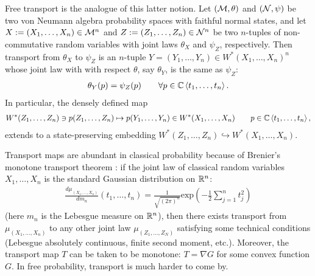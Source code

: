 Free transport is the analogue of this latter notion. Let $(\mathcal{M},\theta)$ and $(\mathcal{N},\psi)$ be two von Neumann algebra probability spaces with faithful normal states, and let $X:=(X_1,\ldots, X_n)\in \mathcal{M}^n$ and $Z:=(Z_1,\ldots, Z_n)\in \mathcal{N}^n$ be two $n$-tuples of non-commutative random variables with joint laws $\theta_X$ and $\psi_Z$, respectively. Then transport from $\theta_X$ to $\psi_Z$  is an $n$-tuple $Y=(Y_1,\ldots, Y_n) \in W^*(X_1,\ldots, X_n)^n$ whose joint law with with respect $\theta$, say $\theta_Y$, is the same as $\psi_Z$:
	\begin{align*}
		\theta_Y(p) = \psi_Z(p)\qquad \forall p\in \mathbb{C}\left\langle t_1,\ldots, t_n\right\rangle.
	\end{align*}
In particular, the densely defined map
	\begin{align*}
		W^*(Z_1,\ldots, Z_n)\ni p(Z_1,\ldots, Z_n) \mapsto p(Y_1,\ldots, Y_n)\in W^*(X_1,\ldots, X_n)\qquad p\in \mathbb{C}\left\langle t_1,\ldots, t_n\right\rangle,
	\end{align*}
extends to a state-preserving embedding $W^*(Z_1,\ldots, Z_n)\hookrightarrow W^*(X_1,\ldots, X_n)$.

Transport maps are abundant in classical probability because of Brenier's monotone transport theorem \cite{Bre91}: if the joint law of classical random variables $X_1,\ldots, X_n$ is the standard Gaussian distribution on $\mathbb{R}^n$:
	\begin{align*}
		\frac{d\mu_{(X_1,\ldots, X_n)}}{dm_n}(t_1,\ldots, t_n) =\frac{1}{\sqrt{(2\pi)^n}} \text{exp}\left(-\frac{1}{2}\sum_{j=1}^n t_j^2\right)
	\end{align*}
(here $m_n$ is the Lebesgue measure on $\mathbb{R}^n$), then there exists transport from $\mu_{(X_1,\ldots, X_n)}$ to any other joint law $\mu_{(Z_1,\ldots, Z_N)}$ satisfying some technical conditions (Lebesgue absolutely continuous, finite second moment, etc.). Moreover, the transport map $T$ can be taken to be monotone: $T=\nabla G$ for some convex function $G$. In free probability, transport is much harder to come by.


